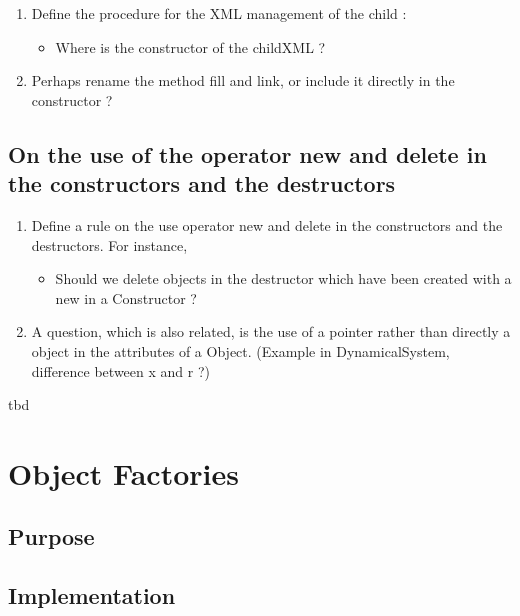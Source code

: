  \begin{ndr}
   \begin{enumerate}
   \item Define the procedure for the XML management of the child :
     \begin{itemize}
     \item  Where  is the constructor of the childXML ?
     \end{itemize}
   \item Perhaps rename the method fill and link, or include it directly in the constructor ?
   \end{enumerate}
 \end{ndr}

\subsection{On the use of the operator new and delete in the constructors and the destructors}


\begin{ndr}
  \begin{enumerate}
  \item Define a rule on the use  operator new and delete in the constructors and the destructors. For instance, 
    \begin{itemize}
    \item Should we delete objects in the destructor which have been created with a new in a Constructor ?
    \end{itemize}
  \item A question, which is also related, is  the use of a pointer rather than directly a object in the attributes of a Object. (Example in DynamicalSystem, difference between x and r ?)
  \end{enumerate}
\end{ndr}
\ac{tbd}
\clearpage


\section{Object Factories}

\subsection{Purpose}

\subsection{Implementation}

